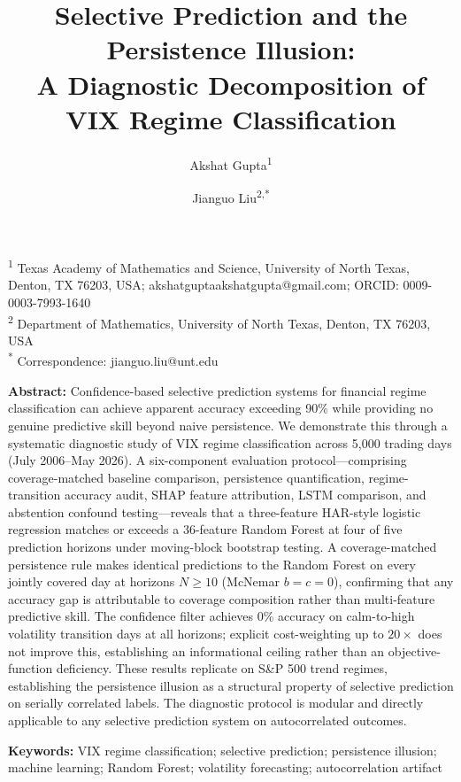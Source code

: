 \documentclass[12pt]{article}
\title{\textbf{Selective Prediction and the Persistence Illusion:\\
A Diagnostic Decomposition of VIX Regime Classification}}
\author{
    Akshat Gupta\textsuperscript{1} \and
    Jianguo Liu\textsuperscript{2,*}
}
\date{}
\begin{document}
\maketitle

\noindent\textsuperscript{1} Texas Academy of Mathematics and Science, University of North Texas,
Denton, TX 76203, USA; akshatguptaakshatgupta@gmail.com; ORCID: 0009-0003-7993-1640\\
\textsuperscript{2} Department of Mathematics, University of North Texas, Denton, TX 76203, USA\\
\textsuperscript{*} Correspondence: jianguo.liu@unt.edu

\vspace{1em}
\noindent\textbf{Abstract:}
Confidence-based selective prediction systems for financial regime classification can achieve
apparent accuracy exceeding 90\% while providing no genuine predictive skill beyond naive
persistence. We demonstrate this through a systematic diagnostic study of VIX regime
classification across 5,000 trading days (July 2006--May 2026). A six-component evaluation
protocol---comprising coverage-matched baseline comparison, persistence quantification,
regime-transition accuracy audit, SHAP feature attribution, LSTM comparison, and abstention
confound testing---reveals that a three-feature HAR-style logistic regression matches or exceeds
a 36-feature Random Forest at four of five prediction horizons under moving-block bootstrap
testing. A coverage-matched persistence rule makes identical predictions to the Random Forest on
every jointly covered day at horizons $N \geq 10$ (McNemar $b = c = 0$), confirming that any
accuracy gap is attributable to coverage composition rather than multi-feature predictive skill.
The confidence filter achieves 0\% accuracy on calm-to-high volatility transition days at all
horizons; explicit cost-weighting up to $20{\times}$ does not improve this, establishing an
informational ceiling rather than an objective-function deficiency. These results replicate on
S\&P 500 trend regimes, establishing the persistence illusion as a structural property of
selective prediction on serially correlated labels. The diagnostic protocol is modular and
directly applicable to any selective prediction system on autocorrelated outcomes.

\vspace{0.5em}
\noindent\textbf{Keywords:} VIX regime classification; selective prediction; persistence illusion;
machine learning; Random Forest; volatility forecasting; autocorrelation artifact
\end{document}
